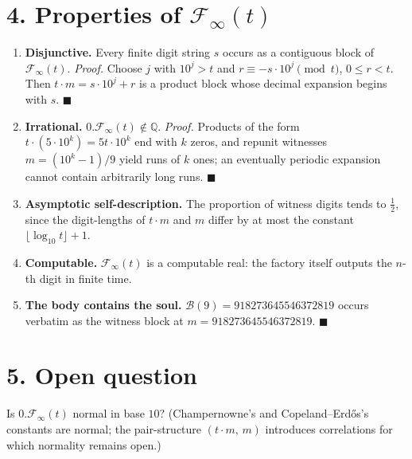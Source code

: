 \documentclass[11pt]{article}
\begin{document}
\section*{4. Properties of $\mathcal{F}_{\infty}(t)$}
\begin{enumerate}
\item[P1.] \textbf{Disjunctive.} Every finite digit string $s$ occurs as a
contiguous block of $\mathcal{F}_{\infty}(t)$.
\emph{Proof.} Choose $j$ with $10^{j} > t$ and $r \equiv -s\cdot 10^{j} \pmod t$,
$0 \le r < t$. Then $t\cdot m = s\cdot 10^{j} + r$ is a product block whose
decimal expansion begins with $s$. $\blacksquare$

\item[P2.] \textbf{Irrational.} $0.\mathcal{F}_{\infty}(t) \notin \mathbb{Q}$.
\emph{Proof.} Products of the form $t\cdot(5\cdot 10^{k}) = 5t\cdot 10^{k}$ end
with $k$ zeros, and repunit witnesses $m=(10^{k}-1)/9$ yield runs of $k$ ones;
an eventually periodic expansion cannot contain arbitrarily long runs.
$\blacksquare$

\item[P3.] \textbf{Asymptotic self-description.} The proportion of witness
digits tends to $\tfrac{1}{2}$, since the digit-lengths of $t\cdot m$ and $m$
differ by at most the constant $\lfloor \log_{10} t \rfloor + 1$.

\item[P4.] \textbf{Computable.} $\mathcal{F}_{\infty}(t)$ is a computable real:
the factory itself outputs the $n$-th digit in finite time.

\item[P5.] \textbf{The body contains the soul.}
$\mathcal{B}(9) = 918273645546372819$ occurs verbatim as the witness block at
$m = 918273645546372819$. $\blacksquare$
\end{enumerate}

\section*{5. Open question}
Is $0.\mathcal{F}_{\infty}(t)$ normal in base $10$? (Champernowne's and
Copeland--Erd\H{o}s's constants are normal; the pair-structure
$(t\cdot m,\, m)$ introduces correlations for which normality remains open.)
\end{document}
